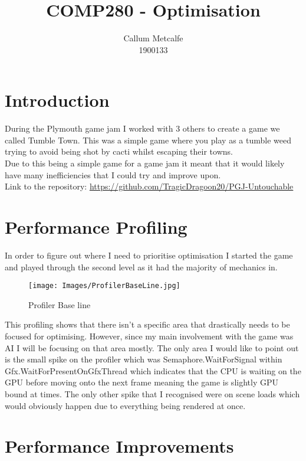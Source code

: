 \documentclass{article}
\title{COMP280 - Optimisation}
\author{Callum Metcalfe\\ 1900133}
\begin{document}
\maketitle

\section{Introduction}

During the Plymouth game jam I worked with 3 others to create a game we called Tumble Town. This was a simple game where you play as a tumble weed trying to avoid being shot by cacti whilst escaping their towns.\\
\newline
Due to this being a simple game for a game jam it meant that it would likely have many inefficiencies that I could try and improve upon.\\
\newline
Link to the repository: \url{https://github.com/TragicDragoon20/PGJ-Untouchable}

\section{Performance Profiling}

In order to figure out where I need to prioritise optimisation I started the game and played through the second level as it had the majority of mechanics in.\\
\begin{figure}[!ht]
    \centering
    \texttt{[image: Images/ProfilerBaseLine.jpg]}
    \caption{Profiler Base line}
    \label{fig:baseline}
\end{figure}

This profiling shows that there isn't a specific area that drastically needs to be focused for optimising. However, since my main involvement with the game was AI I will be focusing on that area mostly. The only area I would like to point out is the small spike on the profiler which was Semaphore.WaitForSignal within Gfx.WaitForPresentOnGfxThread which indicates that the CPU is waiting on the GPU before moving onto the next frame meaning the game is slightly GPU bound at times. The only other spike that I recognised were on scene loads which would obviously happen due to everything being rendered at once. \newline

\section{Performance Improvements}
\end{document}
